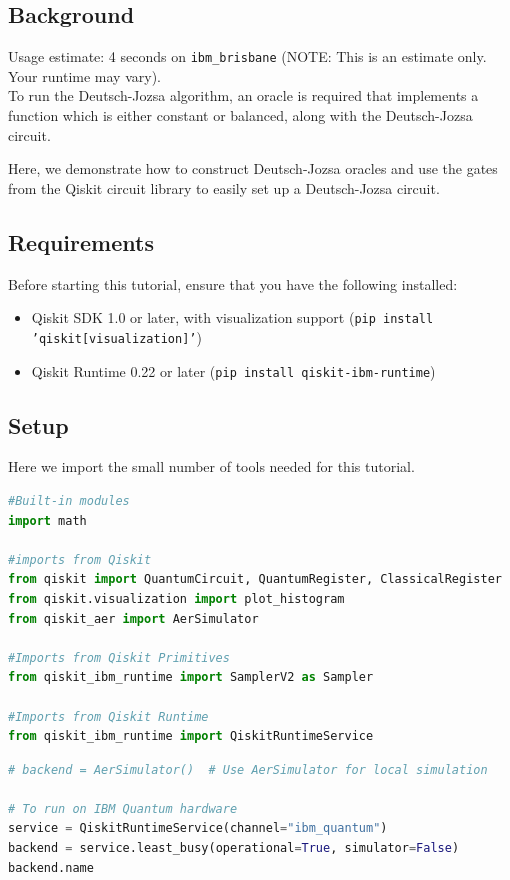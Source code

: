 \subsection{Background}
Usage estimate: 4 seconds on \texttt{ibm\_brisbane} (NOTE: This is an estimate only. Your runtime may vary).\\
To run the Deutsch-Jozsa algorithm, an oracle is required that implements a function which is either constant or balanced, along with the Deutsch-Jozsa circuit.

Here, we demonstrate how to construct Deutsch-Jozsa oracles and use the gates from the Qiskit circuit library to easily set up a Deutsch-Jozsa circuit.

\subsection{Requirements}
Before starting this tutorial, ensure that you have the following installed:
\begin{itemize}
    \item Qiskit SDK 1.0 or later, with visualization support (\texttt{pip install 'qiskit[visualization]'})
    \item Qiskit Runtime 0.22 or later (\texttt{pip install qiskit-ibm-runtime})
\end{itemize}

\subsection{Setup}
Here we import the small number of tools needed for this tutorial.
\begin{lstlisting}[language=Python]
#Built-in modules
import math

#imports from Qiskit
from qiskit import QuantumCircuit, QuantumRegister, ClassicalRegister
from qiskit.visualization import plot_histogram
from qiskit_aer import AerSimulator

#Imports from Qiskit Primitives
from qiskit_ibm_runtime import SamplerV2 as Sampler

#Imports from Qiskit Runtime
from qiskit_ibm_runtime import QiskitRuntimeService
\end{lstlisting}

\begin{lstlisting}[language=Python]
# backend = AerSimulator()  # Use AerSimulator for local simulation

# To run on IBM Quantum hardware
service = QiskitRuntimeService(channel="ibm_quantum")
backend = service.least_busy(operational=True, simulator=False)
backend.name
\end{lstlisting}

